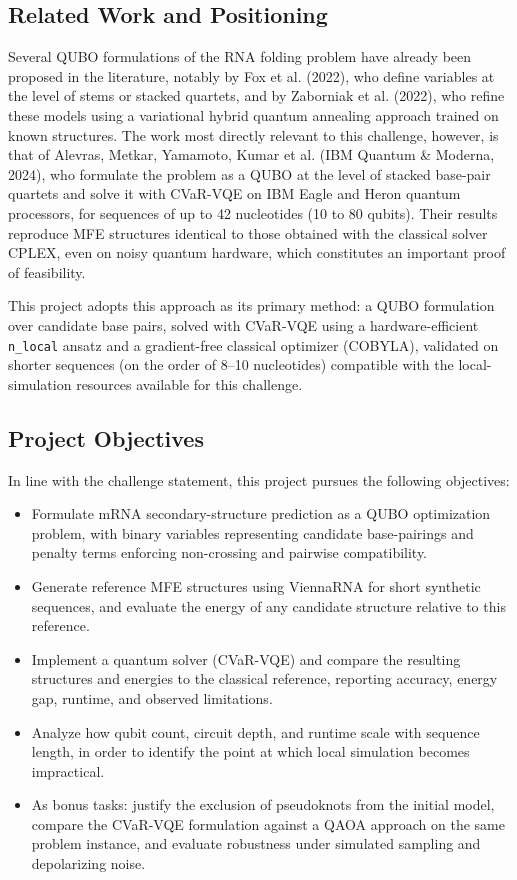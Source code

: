 \documentclass[11pt,a4paper]{article}
\begin{document}
	\subsection{Related Work and Positioning}
	
	Several QUBO formulations of the RNA folding problem have already been proposed in the literature, notably by Fox et al. (2022), who define variables at the level of stems or stacked quartets, and by Zaborniak et al. (2022), who refine these models using a variational hybrid quantum annealing approach trained on known structures. The work most directly relevant to this challenge, however, is that of Alevras, Metkar, Yamamoto, Kumar et al. (IBM Quantum \& Moderna, 2024), who formulate the problem as a QUBO at the level of stacked base-pair quartets and solve it with CVaR-VQE on IBM Eagle and Heron quantum processors, for sequences of up to 42 nucleotides (10 to 80 qubits). Their results reproduce MFE structures identical to those obtained with the classical solver CPLEX, even on noisy quantum hardware, which constitutes an important proof of feasibility.
	
	This project adopts this approach as its primary method: a QUBO formulation over candidate base pairs, solved with CVaR-VQE using a hardware-efficient \texttt{n\_local} ansatz and a gradient-free classical optimizer (COBYLA), validated on shorter sequences (on the order of 8--10 nucleotides) compatible with the local-simulation resources available for this challenge.
	
	\subsection{Project Objectives}
	
	In line with the challenge statement, this project pursues the following objectives:
	
	\begin{itemize}[leftmargin=1.2cm]
		\item Formulate mRNA secondary-structure prediction as a QUBO optimization problem, with binary variables representing candidate base-pairings and penalty terms enforcing non-crossing and pairwise compatibility.
		\item Generate reference MFE structures using ViennaRNA for short synthetic sequences, and evaluate the energy of any candidate structure relative to this reference.
		\item Implement a quantum solver (CVaR-VQE) and compare the resulting structures and energies to the classical reference, reporting accuracy, energy gap, runtime, and observed limitations.
		\item Analyze how qubit count, circuit depth, and runtime scale with sequence length, in order to identify the point at which local simulation becomes impractical.
		\item As bonus tasks: justify the exclusion of pseudoknots from the initial model, compare the CVaR-VQE formulation against a QAOA approach on the same problem instance, and evaluate robustness under simulated sampling and depolarizing noise.
	\end{itemize}
	
\end{document}
